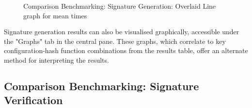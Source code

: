 \documentclass[]{final_report}
\theoremstyle{definition}
\begin{document}
\begin{figure}[H]
\begin{minipage}{0.7\textwidth}
        \centering
        \caption{Comparison Benchmarking: Signature Generation: Overlaid Line graph for mean times}
        \label{fig:image2}
    \end{minipage}
\end{figure}

Signature generation results can also be visualised graphically, accessible under the "Graphs" tab in the central pane. These graphs, which correlate to key configuration-hash function combinations from the results table, offer an alternate method for interpreting the results.

\subsection{Comparison Benchmarking: Signature Verification}
\end{document}
